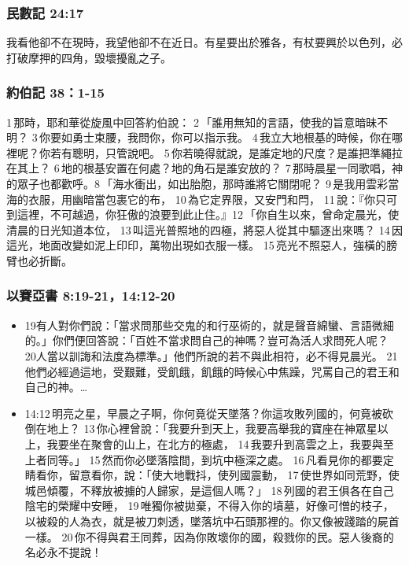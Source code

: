 \subsubsection{民數記 24:17}
我看他卻不在現時，我望他卻不在近日。有星要出於雅各，有杖要興於以色列，必打破摩押的四角，毀壞擾亂之子。

\subsubsection{約伯記 38：1-15}
1 那時，耶和華從旋風中回答約伯說： 2 「誰用無知的言語，使我的旨意暗昧不明？ 3 你要如勇士束腰，我問你，你可以指示我。 4 我立大地根基的時候，你在哪裡呢？你若有聰明，只管說吧。 5 你若曉得就說，是誰定地的尺度？是誰把準繩拉在其上？ 6 地的根基安置在何處？地的角石是誰安放的？ 7 那時晨星一同歌唱，神的眾子也都歡呼。8 「海水衝出，如出胎胞，那時誰將它關閉呢？ 9 是我用雲彩當海的衣服，用幽暗當包裹它的布， 10 為它定界限，又安門和閂， 11 說：『你只可到這裡，不可越過，你狂傲的浪要到此止住。』12 「你自生以來，曾命定晨光，使清晨的日光知道本位， 13 叫這光普照地的四極，將惡人從其中驅逐出來嗎？ 14 因這光，地面改變如泥上印印，萬物出現如衣服一樣。 15 亮光不照惡人，強橫的膀臂也必折斷。

\subsubsection{以賽亞書 8:19-21，14:12-20}
\begin{itemize} 
\itemsep-.25em
\item 19有人對你們說：「當求問那些交鬼的和行巫術的，就是聲音綿蠻、言語微細的。」你們便回答說：「百姓不當求問自己的神嗎？豈可為活人求問死人呢？ 20人當以訓誨和法度為標準。」他們所說的若不與此相符，必不得見晨光。 21他們必經過這地，受艱難，受飢餓，飢餓的時候心中焦躁，咒罵自己的君王和自己的神。…
\item 14:12 明亮之星，早晨之子啊，你何竟從天墜落？你這攻敗列國的，何竟被砍倒在地上？ 13 你心裡曾說：「我要升到天上，我要高舉我的寶座在神眾星以上，我要坐在聚會的山上，在北方的極處， 14 我要升到高雲之上，我要與至上者同等。」 15 然而你必墜落陰間，到坑中極深之處。 16 凡看見你的都要定睛看你，留意看你，說：「使大地戰抖，使列國震動， 17 使世界如同荒野，使城邑傾覆，不釋放被擄的人歸家，是這個人嗎？」 18 列國的君王俱各在自己陰宅的榮耀中安睡， 19 唯獨你被拋棄，不得入你的墳墓，好像可憎的枝子，以被殺的人為衣，就是被刀刺透，墜落坑中石頭那裡的。你又像被踐踏的屍首一樣。 20 你不得與君王同葬，因為你敗壞你的國，殺戮你的民。惡人後裔的名必永不提說！
\end{itemize} 

